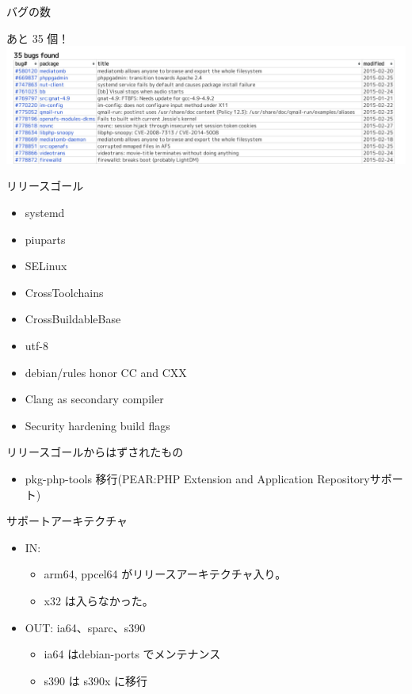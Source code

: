 \begin{frame}{バグの数}
\begin{center}
あと 35 個！
\includegraphics[scale=0.3]{image201502/20150228-rcbugs-cut.jpg}
\end{center}
\end{frame}

\begin{frame}{リリースゴール}
\begin{itemize}
\item systemd
\item piuparts
\item SELinux
\item CrossToolchains
\item CrossBuildableBase
\item utf-8
\item debian/rules honor CC and CXX
\item Clang as secondary compiler
\item Security hardening build flags
\end{itemize}
\end{frame}


\begin{frame}{リリースゴールからはずされたもの}
\begin{itemize}
\item pkg-php-tools 移行(PEAR:PHP Extension and Application Repositoryサポート)
\end{itemize}
\end{frame}

\begin{frame}{サポートアーキテクチャ}

\begin{itemize}
\item IN:
  \begin{itemize}
  \item arm64, ppcel64 がリリースアーキテクチャ入り。
  \item x32 は入らなかった。
  \end{itemize}
\item OUT: ia64、sparc、s390
\begin{itemize}
\item ia64 はdebian-ports でメンテナンス
\item s390 は s390x に移行
\end{itemize}
\end{itemize}

\end{frame}

